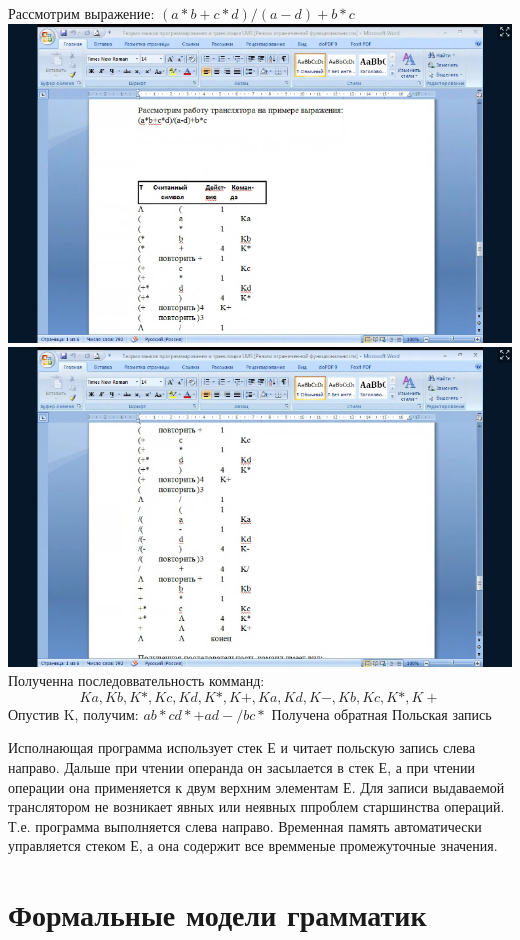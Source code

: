 \documentclass{article}
\begin{document}
    Рассмотрим выражение: $(a*b+c*d)/(a-d)+b*c$ \\

    \includegraphics[scale=0.5]{../pictures/5.png}
    \includegraphics[scale=0.5]{../pictures/6.png}
    Полученна последоввательность комманд:
    $$
       Ka, Kb, K*, Kc, Kd, K*, K+, Ka, Kd, K-, Kb, Kc, K*, K+
    $$
    Опустив K, получим: $ab*cd*+ad-/bc*$
    Получена обратная Польская запись

    Исполнающая программа использует стек Е и читает польскую запись слева направо.
    Дальше при чтении операнда он засылается в стек Е, а при чтении операции она применяется к двум верхним элементам Е.
    Для записи выдаваемой транслятором не возникает явных или неявных ппроблем старшинства операций.
    Т.е. программа выполняется слева направо.
    Временная память автоматически управляется стеком Е, а она содержит все времменые промежуточные значения.
\newpage
    \section{Формальные модели грамматик}
\end{document}
